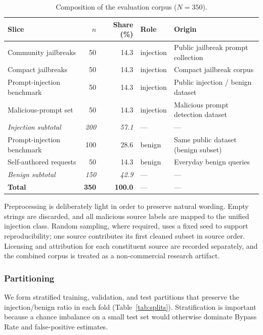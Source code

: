 \documentclass{article}
\begin{document}
\begin{table}[H]
  \centering
  \caption{Composition of the evaluation corpus (\(N=350\)).}
  \label{tab:data-sources}
  \begin{tabular}{lrrlp{4.6cm}}
    \hline
    Slice & \(n\) & Share (\%) & Role & Origin \\
    \hline
    Community jailbreaks & 50 & 14.3 & injection & Public jailbreak prompt collection \\
    Compact jailbreaks & 50 & 14.3 & injection & Compact jailbreak corpus \\
    Prompt-injection benchmark & 50 & 14.3 & injection & Public injection / benign dataset \\
    Malicious-prompt set & 50 & 14.3 & injection & Malicious prompt detection dataset \\
    \textit{Injection subtotal} & \textit{200} & \textit{57.1} & --- & --- \\
    \hline
    Prompt-injection benchmark & 100 & 28.6 & benign & Same public dataset (benign subset) \\
    Self-authored requests & 50 & 14.3 & benign & Everyday benign queries \\
    \textit{Benign subtotal} & \textit{150} & \textit{42.9} & --- & --- \\
    \hline
    \textbf{Total} & \textbf{350} & \textbf{100.0} & --- & --- \\
    \hline
  \end{tabular}
\end{table}

Preprocessing is deliberately light in order to preserve natural wording.
Empty strings are discarded, and all malicious source labels are mapped to the unified injection class.
Random sampling, where required, uses a fixed seed to support reproducibility; one source contributes its first cleaned subset in source order.
Licensing and attribution for each constituent source are recorded separately, and the combined corpus is treated as a non-commercial research artifact.

\subsubsection{Partitioning}

We form stratified training, validation, and test partitions that preserve the injection/benign ratio in each fold (Table~\ref{tab:splits}).
Stratification is important because a chance imbalance on a small test set would otherwise dominate Bypass Rate and false-positive estimates.
\end{document}

